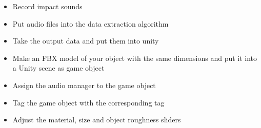 \begin{itemize}
\item Record impact sounds
\item Put audio files into the data extraction algorithm
\item Take the output data and put them into unity
\item Make an FBX\textsuperscript{\textregistered} model of your object with the same dimensions and put it into a Unity\textsuperscript{\textregistered} scene as game object
\item Assign the audio manager to the game object
\item Tag the game object with the corresponding tag
\item Adjust the material, size and object roughness sliders
\end{itemize}


